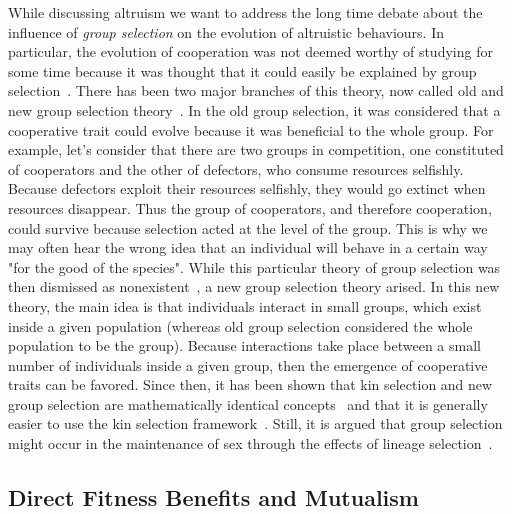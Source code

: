     While discussing altruism we want to address the long time debate about the influence of \emph{group selection} on the evolution of altruistic behaviours. In particular, the evolution of cooperation was not deemed worthy of studying for some time because it was thought that it could easily be explained by group selection~\parencite{Axelrod1981}. There has been two major branches of this theory, now called old and new group selection theory~\parencite{West2007a}. In the old group selection, it was considered that a cooperative trait could evolve because it was beneficial to the whole group. For example, let's consider that there are two groups in competition, one constituted of cooperators and the other of defectors, who consume resources selfishly. Because defectors exploit their resources selfishly, they would go extinct when resources disappear. Thus the group of cooperators, and therefore cooperation, could survive because selection acted at the level of the group. This is why we may often hear the wrong idea that an individual will behave in a certain way "for the good of the species". While this particular theory of group selection was then dismissed as nonexistent~\parencite{MaynardSmith1976}, a new group selection theory arised. In this new theory, the main idea is that individuals interact in small groups, which exist inside a given population (whereas old group selection considered the whole population to be the group). Because interactions take place between a small number of individuals inside a given group, then the emergence of cooperative traits can be favored. Since then, it has been shown that kin selection and new group selection are mathematically identical concepts~\parencite{Hamilton1975, VanBaalen1998, Gardner2007} and that it is generally easier to use the kin selection framework~\parencite{West2007a}. Still, it is argued that group selection might occur in the maintenance of sex through the effects of lineage selection~\parencite{Nunney1989, DeVienne2013}.


  \subsection{Direct Fitness Benefits and Mutualism}

